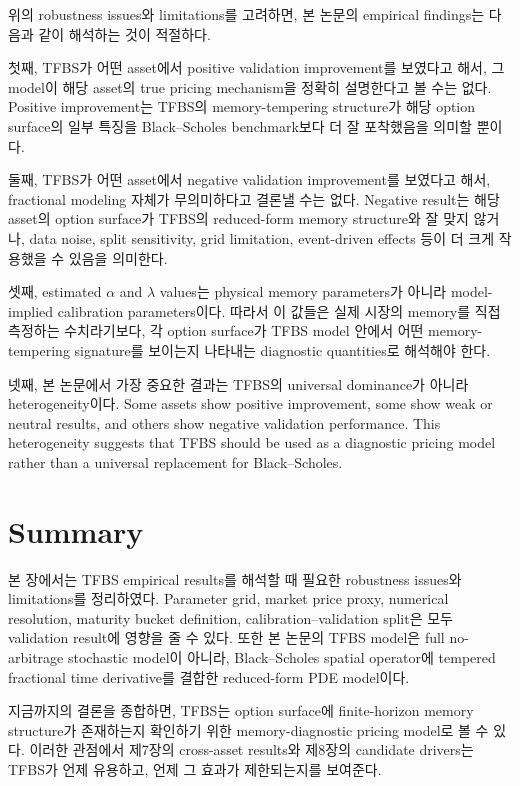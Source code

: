 \documentclass[11pt,a4paper]{report}
\begin{document}
위의 robustness issues와 limitations를 고려하면, 본 논문의 empirical findings는 다음과 같이 해석하는 것이 적절하다.

첫째, TFBS가 어떤 asset에서 positive validation improvement를 보였다고 해서, 그 model이 해당 asset의 true pricing mechanism을 정확히 설명한다고 볼 수는 없다. Positive improvement는 TFBS의 memory-tempering structure가 해당 option surface의 일부 특징을 Black--Scholes benchmark보다 더 잘 포착했음을 의미할 뿐이다.

둘째, TFBS가 어떤 asset에서 negative validation improvement를 보였다고 해서, fractional modeling 자체가 무의미하다고 결론낼 수는 없다. Negative result는 해당 asset의 option surface가 TFBS의 reduced-form memory structure와 잘 맞지 않거나, data noise, split sensitivity, grid limitation, event-driven effects 등이 더 크게 작용했을 수 있음을 의미한다.

셋째, estimated \(\alpha\) and \(\lambda\) values는 physical memory parameters가 아니라 model-implied calibration parameters이다. 따라서 이 값들은 실제 시장의 memory를 직접 측정하는 수치라기보다, 각 option surface가 TFBS model 안에서 어떤 memory-tempering signature를 보이는지 나타내는 diagnostic quantities로 해석해야 한다.

넷째, 본 논문에서 가장 중요한 결과는 TFBS의 universal dominance가 아니라 heterogeneity이다. Some assets show positive improvement, some show weak or neutral results, and others show negative validation performance. This heterogeneity suggests that TFBS should be used as a diagnostic pricing model rather than a universal replacement for Black--Scholes.

\section{Summary}

본 장에서는 TFBS empirical results를 해석할 때 필요한 robustness issues와 limitations를 정리하였다. Parameter grid, market price proxy, numerical resolution, maturity bucket definition, calibration--validation split은 모두 validation result에 영향을 줄 수 있다. 또한 본 논문의 TFBS model은 full no-arbitrage stochastic model이 아니라, Black--Scholes spatial operator에 tempered fractional time derivative를 결합한 reduced-form PDE model이다.

지금까지의 결론을 종합하면, TFBS는 option surface에 finite-horizon memory structure가 존재하는지 확인하기 위한 memory-diagnostic pricing model로 볼 수 있다. 이러한 관점에서 제7장의 cross-asset results와 제8장의 candidate drivers는 TFBS가 언제 유용하고, 언제 그 효과가 제한되는지를 보여준다.
\end{document}
